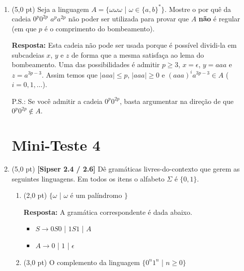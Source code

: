 \documentclass[12pt,a4paper,oneside]{article}
\begin{document}
\begin{enumerate}
	\vspace*{0.5cm}
	
	\item (5,0 pt) Seja a linguagem $A = \{\omega \omega \omega$ | $\omega \in \{a,b\}^*\}$. Mostre o por quê da cadeia \st{$0^p0^{2p}$} $a^pa^{2p}$ não poder ser utilizada para provar que $A$ {\bf não} é regular (em que $p$ é o comprimento do bombeamento).
	
		\vspace*{0.3cm}
	
	{\color{blue} {\bf Resposta:} Esta cadeia não pode ser usada porque é possível dividi-la em subcadeias $x$, $y$ e $z$ de forma que a mesma satisfaça ao lema do bombeamento. Uma das possibilidades é admitir $p \geq 3$, $x=\epsilon$, $y=aaa$ e $z=a^{3p-3}$. Assim temos que $|aaa| \leq p$, $|aaa| \geq 0$ e $(aaa)^ia^{3p-3} \in A$ ($i=0, 1, \ldots$).
		
	\vspace*{0.2cm}
		
	P.S.: Se você admitir a cadeia $0^p0^{2p}$, basta argumentar na direção de que $0^p0^{2p} \not\in A$.
	}

	\section*{Mini-Teste 4}

	\item (5,0 pt) {\bf [Sipser 2.4 / 2.6]}  Dê gramáticas livres-do-contexto que gerem as seguintes linguagens. Em todos os itens o alfabeto $\Sigma$ é $\{0,1\}$.
	\begin{enumerate}
		\item (2,0 pt) $\{\omega$ | $\omega$ é um palíndromo $\}$
		
		\vspace*{0.3cm}
		
		{\color{blue} {\bf Resposta:} A gramática correspondente é dada abaixo.
			\begin{itemize}
				\item[] $S \rightarrow 0S0$ | $1S1$ | $A$
				\item[] $A \rightarrow 0$ | $1$ | $\epsilon$
			\end{itemize}
		}
	
		\item (3,0 pt) O complemento da linguagem $\{0^n 1^n$ | $n \geq 0 \}$
		
			\vspace*{0.3cm}
		

\end{enumerate}
\end{enumerate}
\end{document}
